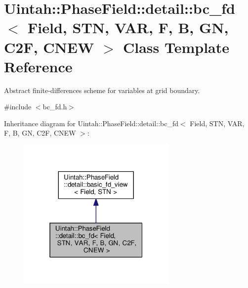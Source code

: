 \hypertarget{classUintah_1_1PhaseField_1_1detail_1_1bc__fd}{}\section{Uintah\+:\+:Phase\+Field\+:\+:detail\+:\+:bc\+\_\+fd$<$ Field, S\+TN, V\+AR, F, B, GN, C2F, C\+N\+EW $>$ Class Template Reference}
\label{classUintah_1_1PhaseField_1_1detail_1_1bc__fd}


Abstract finite-\/differences scheme for variables at grid boundary.  




{\ttfamily \#include $<$bc\+\_\+fd.\+h$>$}



Inheritance diagram for Uintah\+:\+:Phase\+Field\+:\+:detail\+:\+:bc\+\_\+fd$<$ Field, S\+TN, V\+AR, F, B, GN, C2F, C\+N\+EW $>$\+:\nopagebreak
\begin{figure}[H]
\begin{center}
\leavevmode
\includegraphics[width=220pt]{classUintah_1_1PhaseField_1_1detail_1_1bc__fd__inherit__graph}
\end{center}
\end{figure}


